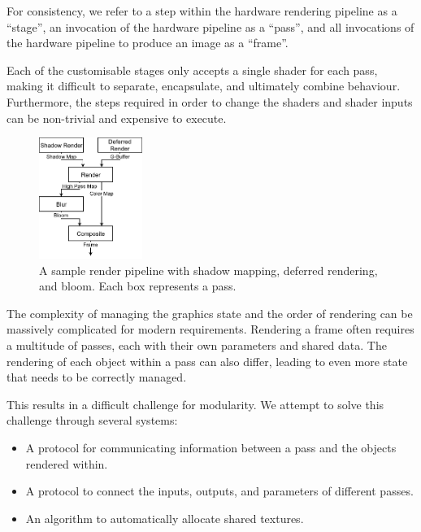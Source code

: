 \documentclass[format=sigconf]{acmart}
\begin{document}
For consistency, we refer to a step within the hardware rendering pipeline as a ``stage'', an invocation of the hardware pipeline as a ``pass'', and all invocations of the hardware pipeline to produce an image as a ``frame''.

Each of the customisable stages only accepts a single shader for each pass, making it difficult to separate, encapsulate, and ultimately combine behaviour. Furthermore, the steps required in order to change the shaders and shader inputs can be non-trivial and expensive to execute.

\begin{figure}[h]
  \begin{center}
    \includegraphics[width=0.3\textwidth]{render-pipeline.png}
  \end{center}
  \caption{A sample render pipeline with shadow mapping, deferred rendering, and bloom. Each box represents a pass.}
  \label{fig:renderpipeline}
\end{figure}

The complexity of managing the graphics state and the order of rendering can be massively complicated for modern requirements. Rendering a frame often requires a multitude of passes, each with their own parameters and shared data. The rendering of each object within a pass can also differ, leading to even more state that needs to be correctly managed.

This results in a difficult challenge for modularity. We attempt to solve this challenge through several systems:

\begin{itemize}
\item A protocol for communicating information between a pass and the objects rendered within.
\item A protocol to connect the inputs, outputs, and parameters of different passes.
\item An algorithm to automatically allocate shared textures.
\end{itemize}
\end{document}

